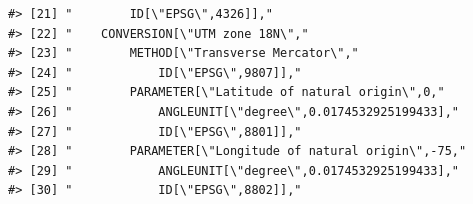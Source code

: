 \documentclass[
]{book}
\begin{document}
\begin{verbatim}
#> [21] "        ID[\"EPSG\",4326]],"                                                                                                                                                                                                                                                    
#> [22] "    CONVERSION[\"UTM zone 18N\","                                                                                                                                                                                                                                               
#> [23] "        METHOD[\"Transverse Mercator\","                                                                                                                                                                                                                                        
#> [24] "            ID[\"EPSG\",9807]],"                                                                                                                                                                                                                                                
#> [25] "        PARAMETER[\"Latitude of natural origin\",0,"                                                                                                                                                                                                                            
#> [26] "            ANGLEUNIT[\"degree\",0.0174532925199433],"                                                                                                                                                                                                                          
#> [27] "            ID[\"EPSG\",8801]],"                                                                                                                                                                                                                                                
#> [28] "        PARAMETER[\"Longitude of natural origin\",-75,"                                                                                                                                                                                                                         
#> [29] "            ANGLEUNIT[\"degree\",0.0174532925199433],"                                                                                                                                                                                                                          
#> [30] "            ID[\"EPSG\",8802]],"                                                                                                                                                                                                                                                

\end{verbatim}
\end{document}
